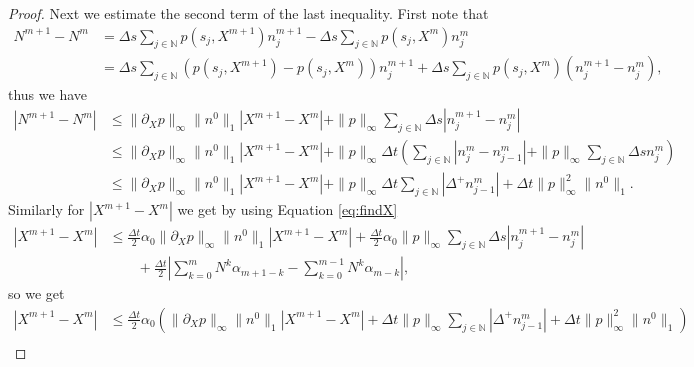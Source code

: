 \documentclass[11pt,a4paper]{article}
\newcommand{\N}{\mathbb{N}}
\begin{document}
\begin{proof}
Next we estimate the second term of the last inequality. First note that
\begin{equation*}
    \begin{split}
      N^{m+1}- N^{m}& =\Delta s \sum_{j\in\N}p(s_j,X^{m+1})n_j^{m+1}-\Delta s \sum_{j\in\N} p(s_j,X^{m})n_j^{m}\\
    &=\Delta s \sum_{j\in\N}(p(s_j,X^{m+1})-p(s_j,X^{m}))n_j^{m+1}+\Delta s \sum_{j\in\N}p(s_j,X^m)(n_j^{m+1}-n_j^m),
    \end{split}
\end{equation*}
thus we have
\begin{equation}
\label{N1-N2-d}
    \begin{split}
      |N^{m+1}- N^{m}|&\le \|\partial_X p\|_\infty \|n^0\|_1 |X^{m+1}-X^{m}|+\|p\|_\infty\sum_{j\in\N}\Delta s|n^{m+1}_j-n^m_j|\\
      &\le  \|\partial_X p\|_\infty \|n^0\|_1 |X^{m+1}-X^{m}| + \|p\|_\infty\Delta t\left(  \sum_{j\in\N} | n_j^{m}-n_{j-1}^m|  + \|p\|_\infty \sum_{j\in\N}  \Delta s n_j^m \right)\\
      &\le  \|\partial_X p\|_\infty \|n^0\|_1 |X^{m+1}-X^{m}| + \|p\|_\infty\Delta t  \sum_{j\in\N} |\Delta^+ n^m_{j-1}| + \Delta t\|p\|_\infty^2\|n^0\|_1.
    \end{split}
\end{equation}
Similarly for $|X^{m+1}-X^{m}|$ we get by using Equation \eqref{eq:findX}
\begin{equation*}
    \begin{split}
       |X^{m+1}-X^m|&\le \frac{\Delta t}{2}\alpha_0\|\partial_X p\|_\infty\|n^0\|_1 |X^{m+1}-X^{m}|+\frac{\Delta t}{2}\alpha_0\|p\|_\infty\sum_{j\in\N}\Delta s|n^{m+1}_j-n^m_j|\\
       &\qquad +\frac{\Delta t}{2}\left|\sum_{k=0}^m N^k\alpha_{m+1-k}-\sum_{k=0}^{m-1} N^k\alpha_{m-k}\right|,
    \end{split}
\end{equation*}
so we get
\begin{equation*}
    \begin{split}
       |X^{m+1}-X^m|&\le \frac{\Delta t}{2}\alpha_0\left(\|\partial_X p\|_\infty\|n^0\|_1 |X^{m+1}-X^{m}|+\Delta t\|p\|_\infty\sum_{j\in\N} |\Delta^+ n^m_{j-1}| +\Delta t\|p\|_\infty^2\|n^0\|_1\right)\\

\end{split}
\end{equation*}
\end{proof}
\end{document}
